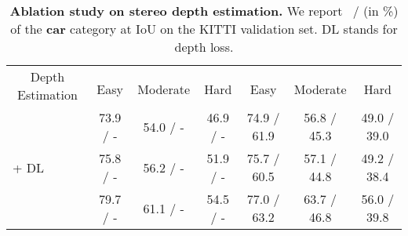 \begin{table*}[!htb]
	\centering
	\caption{\textbf{Ablation study on stereo depth estimation.} We report \APBEV ~/ \AP (in \%) of the \textbf{car} category at IoU on the KITTI validation set. DL stands for depth loss. \label{stbl:ablation_sdn}}
	\tabcolsep 2.5pt
	\begin{tabular}{l|c|c|c|c|c|c}
		\hline
		\multicolumn{1}{c|}{\multirow{2}{*}{Depth Estimation}}                                                           & \multicolumn{3}{c|}{\vPIXOR} & \multicolumn{3}{c}{\AVOD} \\ \cline{2-7}
		\multicolumn{1}{c|}{}                                                   & Easy        & Moderate   & Hard   & Easy        & Moderate   & Hard     \\ \hline
		\PSMNetpd                                                                  &  73.9 / - \hspace{10pt}   & 54.0 / - \hspace{10pt}  & 46.9 / -  \hspace{10pt} & 74.9 / 61.9 &  56.8 / 45.3 & 49.0 / 39.0  \\
		\PSMNetpd + DL                                                             &  75.8 / - \hspace{10pt}   & 56.2 / - \hspace{10pt}  & 51.9 / - \hspace{10pt}  & 75.7 / 60.5 & 57.1 / 44.8 & 49.2 / 38.4  \\
		\SDN    & 79.7 / - \hspace{10pt}   & 61.1 / - \hspace{10pt}  & 54.5 / - \hspace{10pt}  & 77.0 / 63.2 & 63.7 / 46.8 & 56.0 / 39.8  \\ \hline
	\end{tabular}
\end{table*}

